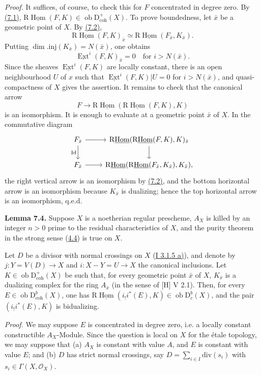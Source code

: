 \documentclass[11pt]{article}
\DeclareMathOperator{\Hom}{Hom}
\DeclareMathOperator{\Ext}{Ext}
\newcommand{\R}{\mathrm{R}}
\newcommand{\D}{\mathrm{D}}
\newcommand{\ob}{\operatorname{ob}}
\providecommand{\Hom}{\operatorname{Hom}}
\providecommand{\ob}{\operatorname{ob}}
\providecommand{\R}{\mathrm R}
\providecommand{\Hom}{\operatorname{Hom}}
\begin{document}
\emph{Proof.} It suffices, of course, to check this for $F$ concentrated in degree zero. By \hyperref[sga5:I:lemma:7.1]{(7.1)}, $\R\underline{\Hom}(F,K)\in\ob\D^{+}_{\mathrm{coh}}(X)$. To prove boundedness, let $\bar{x}$ be a geometric point of $X$. By \hyperref[sga5:I:lemma:7.2]{(7.2)},
\[
        \R\underline{\Hom}(F,K)_{\bar{x}}\simeq \R\underline{\Hom}(F_{\bar{x}},K_{\bar{x}}).
\]
Putting $\dim.\mathrm{inj}(K_{\bar{x}})=N(\bar{x})$, one obtains
\[
        \underline{\Ext}^i(F,K)_{\bar{x}}=0\quad\text{for }i>N(\bar{x}).
\]
Since the sheaves $\underline{\Ext}^{i}(F,K)$ are locally constant, there is an open neighbourhood $U$ of $x$ such that $\underline{\Ext}^{i}(F,K)|U=0$ for $i>N(\bar{x})$, and quasi-compactness of $X$ gives the assertion. It remains to check that the canonical arrow
\[
        F\longrightarrow \R\underline{\Hom}(\R\underline{\Hom}(F,K),K)
\]
is an isomorphism. It is enough to evaluate at a geometric point $\bar{x}$ of $X$. In the commutative diagram
\[
\begin{tikzcd}
F_{\bar{x}} \arrow[r] \arrow[d,"\mathrm{Id}"'] & \R\underline{\Hom}(\R\underline{\Hom}(F,K),K)_{\bar{x}} \arrow[d]\\
F_{\bar{x}} \arrow[r] & \R\underline{\Hom}(\R\underline{\Hom}(F_{\bar{x}},K_{\bar{x}}),K_{\bar{x}}),
\end{tikzcd}
\]
the right vertical arrow is an isomorphism by \hyperref[sga5:I:lemma:7.2]{(7.2)}, and the bottom horizontal arrow is an isomorphism because $K_{\bar{x}}$ is dualizing; hence the top horizontal arrow is an isomorphism, q.e.d.

\label{sga5:I:lemma:7.4}\textbf{Lemma 7.4.} Suppose $X$ is a noetherian regular prescheme, $A_X$ is killed by an integer $n>0$ prime to the residual characteristics of $X$, and the purity theorem in the strong sense (\hyperref[sga5:I:definition:4.4]{4.4}) is true on $X$.

Let $D$ be a divisor with normal crossings on $X$ (\hyperref[sga5:I:statement:3.1.5]{I 3.1.5 a)}), and denote by $j:Y=V(D)\to X$ and $i:X-Y=U\to X$ the canonical inclusions. Let $K\in\ob\D^{+}_{\mathrm{coh}}(X)$ be such that, for every geometric point $\bar{x}$ of $X$, $K_{\bar{x}}$ is a dualizing complex for the ring $A_{\bar{x}}$ (in the sense of [H] V 2.1). Then, for every $E\in\ob\D^{b}_{\mathrm{coh}}(X)$, one has $\R\underline{\Hom}(i_!i^*(E),K)\in\ob\D^{b}_{c}(X)$, and the pair $(i_!i^*(E),K)$ is bidualizing.

\emph{Proof.} We may suppose $E$ is concentrated in degree zero, i.e. a locally constant constructible $A_X$-Module. Since the question is local on $X$ for the étale topology, we may suppose that (a) $A_X$ is constant with value $A$, and $E$ is constant with value $E$; and (b) $D$ has strict normal crossings, say $D=\sum_{i\in I}\mathrm{div}(s_i)$ with $s_i\in\Gamma(X,\mathcal{O}_X)$.
\end{document}
